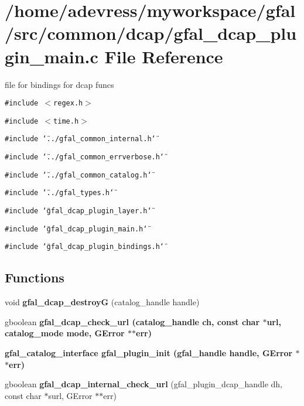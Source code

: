 \section{/home/adevress/myworkspace/gfal/src/common/dcap/gfal\_\-dcap\_\-plugin\_\-main.c File Reference}
\label{gfal__dcap__plugin__main_8c}
file for bindings for dcap funcs 

{\tt \#include $<$regex.h$>$}\par
{\tt \#include $<$time.h$>$}\par
{\tt \#include \char`\"{}../gfal\_\-common\_\-internal.h\char`\"{}}\par
{\tt \#include \char`\"{}../gfal\_\-common\_\-errverbose.h\char`\"{}}\par
{\tt \#include \char`\"{}../gfal\_\-common\_\-catalog.h\char`\"{}}\par
{\tt \#include \char`\"{}../gfal\_\-types.h\char`\"{}}\par
{\tt \#include \char`\"{}gfal\_\-dcap\_\-plugin\_\-layer.h\char`\"{}}\par
{\tt \#include \char`\"{}gfal\_\-dcap\_\-plugin\_\-main.h\char`\"{}}\par
{\tt \#include \char`\"{}gfal\_\-dcap\_\-plugin\_\-bindings.h\char`\"{}}\par
\subsection*{Functions}
\begin{CompactItemize}
\item 
void \textbf{gfal\_\-dcap\_\-destroy\-G} (catalog\_\-handle handle)\label{gfal__dcap__plugin__main_8c_3cf3ae23969060c6a7237d026e6b75b1}

\item 
gboolean \bf{gfal\_\-dcap\_\-check\_\-url} (catalog\_\-handle ch, const char $\ast$url, catalog\_\-mode mode, GError $\ast$$\ast$err)
\item 
\bf{gfal\_\-catalog\_\-interface} \bf{gfal\_\-plugin\_\-init} (gfal\_\-handle handle, GError $\ast$$\ast$err)
\item 
gboolean \textbf{gfal\_\-dcap\_\-internal\_\-check\_\-url} (gfal\_\-plugin\_\-dcap\_\-handle dh, const char $\ast$surl, GError $\ast$$\ast$err)\label{gfal__dcap__plugin__main_8c_73fbacad3f9f3025a24c39f4d1dfad2d}

\end{CompactItemize}



